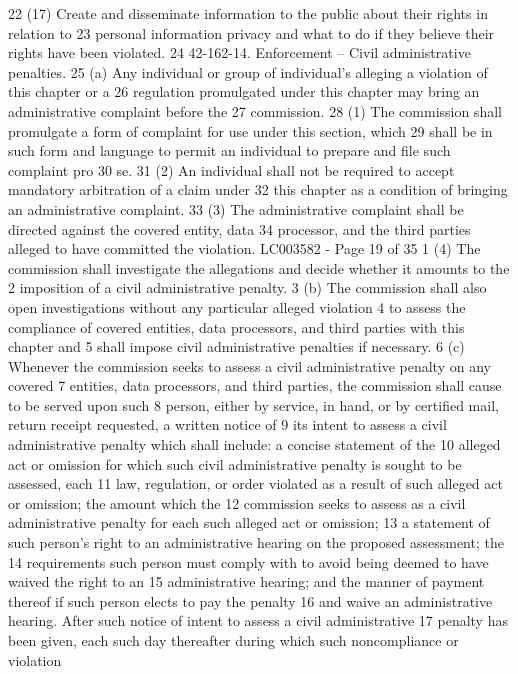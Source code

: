 22 (17) Create and disseminate information to the public about their rights in relation to
23 personal information privacy and what to do if they believe their rights have been violated.
24 42-162-14. Enforcement -- Civil administrative penalties.
25 (a) Any individual or group of individual's alleging a violation of this chapter or a
26 regulation promulgated under this chapter may bring an administrative complaint before the
27 commission.
28 (1) The commission shall promulgate a form of complaint for use under this section, which
29 shall be in such form and language to permit an individual to prepare and file such complaint pro
30 se.
31 (2) An individual shall not be required to accept mandatory arbitration of a claim under
32 this chapter as a condition of bringing an administrative complaint.
33 (3) The administrative complaint shall be directed against the covered entity, data
34 processor, and the third parties alleged to have committed the violation.
LC003582 - Page 19 of 35
1 (4) The commission shall investigate the allegations and decide whether it amounts to the
2 imposition of a civil administrative penalty.
3 (b) The commission shall also open investigations without any particular alleged violation
4 to assess the compliance of covered entities, data processors, and third parties with this chapter and
5 shall impose civil administrative penalties if necessary.
6 (c) Whenever the commission seeks to assess a civil administrative penalty on any covered
7 entities, data processors, and third parties, the commission shall cause to be served upon such
8 person, either by service, in hand, or by certified mail, return receipt requested, a written notice of
9 its intent to assess a civil administrative penalty which shall include: a concise statement of the
10 alleged act or omission for which such civil administrative penalty is sought to be assessed, each
11 law, regulation, or order violated as a result of such alleged act or omission; the amount which the
12 commission seeks to assess as a civil administrative penalty for each such alleged act or omission;
13 a statement of such person's right to an administrative hearing on the proposed assessment; the
14 requirements such person must comply with to avoid being deemed to have waived the right to an
15 administrative hearing; and the manner of payment thereof if such person elects to pay the penalty
16 and waive an administrative hearing. After such notice of intent to assess a civil administrative
17 penalty has been given, each such day thereafter during which such noncompliance or violation
